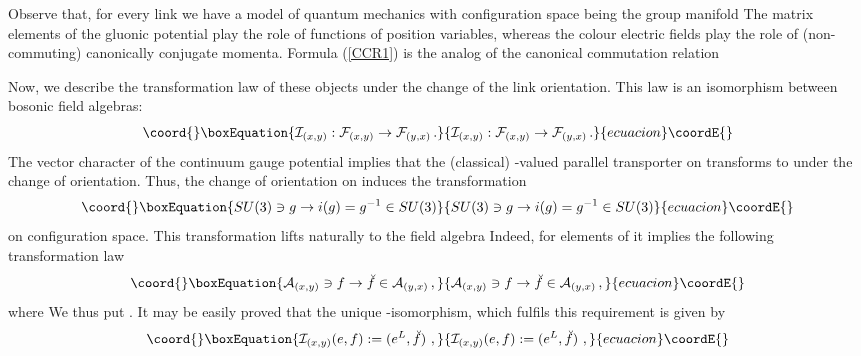 \documentclass[a4paper,12pt]{article}
\begin{document}
Observe that, for every link \coordHE{} we have a model of
quantum mechanics with configuration space being the group
manifold \coordHE{} The matrix elements of the gluonic potential
play the role of functions of position variables, whereas the
colour electric fields play the role of (non-commuting)
canonically conjugate momenta. Formula (\ref{CCR1}) is the analog
of the canonical commutation relation \coordHE{}

\vspace{0.2cm} \noindent Now, we describe the transformation law
of these objects under the change of the link orientation. This
law is an isomorphism between bosonic field algebras:
\begin{equation}\coord{}\boxEquation{
\label{izo-I} {\cal I}_{(x,y)} : {\cal F}_{(x,y)} \rightarrow
{\cal F}_{(y,x)} \, .
}{
{\cal I}_{(x,y)} : {\cal F}_{(x,y)} \rightarrow
{\cal F}_{(y,x)} \, .
}{ecuacion}\coordE{}\end{equation}
The vector character of the continuum gauge potential implies that
the (classical) \coordHE{}-valued parallel transporter \coordHE{} on
\coordHE{} transforms to \coordHE{} under the change of
orientation. Thus, the change of orientation on \coordHE{} induces
the transformation
\begin{equation}\coord{}\boxEquation{
\label{inverse} SU(3) \ni g \rightarrow i(g) = g^{-1} \in SU(3)
}{
SU(3) \ni g \rightarrow i(g) = g^{-1} \in SU(3)
}{ecuacion}\coordE{}\end{equation}
on configuration space. This transformation lifts naturally to the
field algebra \coordHE{} Indeed, for elements of
\coordHE{} it implies the following transformation law
\begin{equation}\coord{}\boxEquation{
\label{izo-f} {\cal A}_{(x,y)} \ni f \rightarrow  \breve{f}  \in
{\cal A}_{(y,x)} \, ,
}{
{\cal A}_{(x,y)} \ni f \rightarrow  \breve{f}  \in
{\cal A}_{(y,x)} \, ,
}{ecuacion}\coordE{}\end{equation}
where \coordHE{} We thus put \coordHE{}. It may be easily proved that
the unique \myHighlight{$*$}\coordHE{}-isomorphism, which fulfils this requirement is
given by
\begin{equation}\coord{}\boxEquation{
\label{izo-I1} {\cal I}_{(x,y)}(e,f) := (e^L, \breve{f} ) \ ,
}{
{\cal I}_{(x,y)}(e,f) := (e^L, \breve{f} ) \ ,
}{ecuacion}\coordE{}\end{equation}
\end{document}

